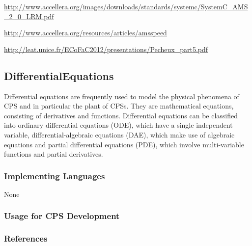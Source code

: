 \url{http://www.accellera.org/images/downloads/standards/systemc/SystemC_AMS_2_0_LRM.pdf} %

\url{http://www.accellera.org/resources/articles/amsspeed}

\url{http://leat.unice.fr/ECoFaC2012/presentations/Pecheux_part5.pdf}

\subsection{DifferentialEquations}
\label{subsecF:DifferentialEquations}




Differential equations are frequently used to model the physical phenomena of CPS and in particular the plant of CPSs. They are mathematical equations, consisting of derivatives and functions. Differential equations can be classified into ordinary differential equations (ODE), which have a single independent variable, differential-algebraic equations (DAE), which make use of algebraic equations and partial differential equations (PDE), which involve multi-variable functions and partial derivatives.

\subsubsection{Implementing Languages}

None

\subsubsection{Usage for CPS Development}

\cite{L2015}


\subsubsection{References}


